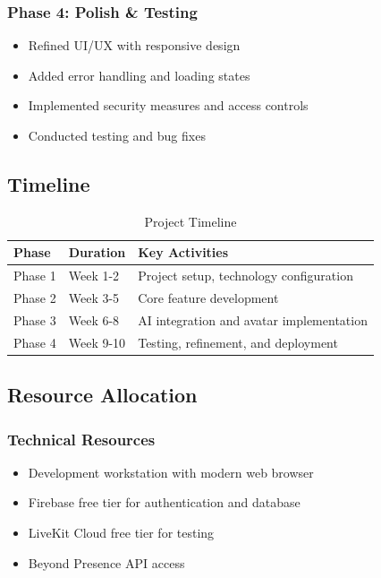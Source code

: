 \documentclass[11pt,a4paper]{article}
\begin{document}
\subsubsection{Phase 4: Polish \& Testing}
\begin{itemize}
    \item Refined UI/UX with responsive design
    \item Added error handling and loading states
    \item Implemented security measures and access controls
    \item Conducted testing and bug fixes
\end{itemize}

\subsection{Timeline}

\begin{table}[h]
\centering
\begin{tabular}{|l|l|p{6cm}|}
\hline
\textbf{Phase} & \textbf{Duration} & \textbf{Key Activities} \\
\hline
Phase 1 & Week 1-2 & Project setup, technology configuration \\
\hline
Phase 2 & Week 3-5 & Core feature development \\
\hline
Phase 3 & Week 6-8 & AI integration and avatar implementation \\
\hline
Phase 4 & Week 9-10 & Testing, refinement, and deployment \\
\hline
\end{tabular}
\caption{Project Timeline}
\end{table}

\subsection{Resource Allocation}

\subsubsection{Technical Resources}
\begin{itemize}
    \item Development workstation with modern web browser
    \item Firebase free tier for authentication and database
    \item LiveKit Cloud free tier for testing
    \item Beyond Presence API access
\end{itemize}
\end{document}
